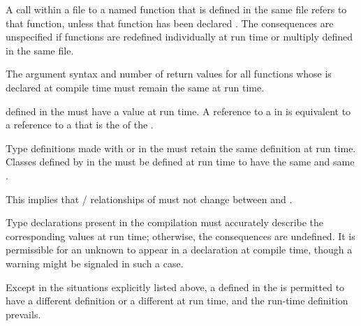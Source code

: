  \itemitem{\bull} A call within a file to a named function that is
defined in the same file refers to that function, unless that function
has been declared .  The consequences are unspecified
if functions are redefined individually at run time or multiply
defined in the same file.

  
 \itemitem{\bull} The argument syntax and number of return values for
all functions whose  is declared at compile time must
remain the same at run time.
 
 \itemitem{\bull}  defined in
the  must have a  value at
run time.  A reference to 
a  
in  is equivalent to a reference to 
a   that is the  of the .
 
 \itemitem{\bull} Type definitions made with  or
 in the  must
retain the same definition at run time.  Classes defined by 
in the  must be defined
at run time to have the same  and same 
.

This implies that / relationships of 
 must not change between  and .  
 
 \itemitem{\bull} Type declarations present in the compilation 
 must accurately describe the corresponding values at run time;
otherwise, the consequences are undefined.  It is permissible
for an unknown  to appear in a declaration at 
compile time, though a warning might be signaled in such a case.

 \itemitem{\bull} Except in the situations explicitly listed above, a
 defined in the 
is permitted to have a different definition or a different 
at run time, and the run-time definition prevails.

